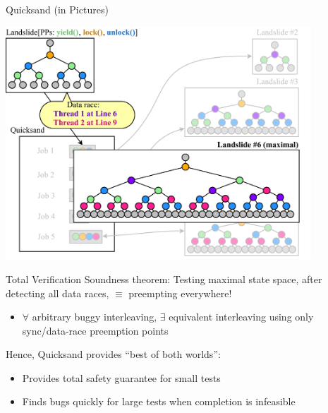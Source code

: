 \documentclass[xcolor=dvipsnames]{beamer}
\begin{document}
\begin{frame}{Quicksand (in Pictures)}
	\begin{center}
	\vspace{-0.88em}
	\includegraphics[width=0.86\textwidth]{dr-jobs-maximal.pdf}
	\end{center}
\end{frame}

\begin{frame}{Total Verification}
	Soundness theorem: Testing maximal state space, after detecting all data races, $\equiv$ preempting everywhere!
	\begin{itemize}
		\item $\forall$ arbitrary buggy interleaving, $\exists$ equivalent interleaving %
			using only sync/data-race preemption points %
	\end{itemize}
	\linegap

	Hence, Quicksand provides ``best of both worlds'':
	\begin{itemize}
		\item Provides total safety guarantee for small tests
		\item Finds bugs quickly for large tests when completion is infeasible
	\end{itemize}
\end{frame}
\end{document}
